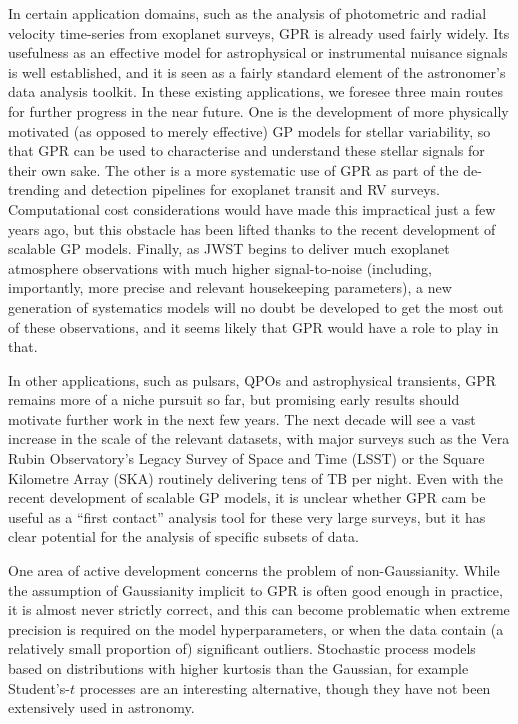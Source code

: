 \documentclass[letterpaper]{ar-1col}
\begin{document}
In certain application domains, such as the analysis of photometric and radial velocity time-series from exoplanet surveys, GPR is already used fairly widely. Its usefulness as an effective model for astrophysical or instrumental nuisance signals is well established, and it is seen as a fairly standard element of the astronomer's data analysis toolkit. In these existing applications, we foresee three main routes for further progress in the near future. One is the development of more physically motivated (as opposed to merely effective) GP models for stellar variability, so that GPR can be used to characterise and understand these stellar signals for their own sake. The other is a more systematic use of GPR as part of the de-trending and detection pipelines for exoplanet transit and RV surveys. Computational cost considerations would have made this impractical just a few years ago, but this obstacle has been lifted thanks to the recent development of scalable GP models. Finally, as JWST begins to deliver much exoplanet atmosphere observations with much higher signal-to-noise (including, importantly, more precise and relevant housekeeping parameters), a new generation of systematics models will no doubt be developed to get the most out of these observations, and it seems likely that GPR would have a role to play in that.

In other applications, such as pulsars, QPOs and astrophysical transients, GPR remains more of a niche pursuit so far, but promising early results should motivate further work in the next few years. The next decade will see a vast increase in the scale of the relevant datasets, with major surveys such as the Vera Rubin Observatory's Legacy Survey of Space and Time (LSST) or the Square Kilometre Array (SKA) routinely delivering tens of TB per night. Even with the recent development of scalable GP models, it is unclear whether GPR cam be useful as a ``first contact'' analysis tool for these very large surveys, but it has clear potential for the analysis of specific subsets of data.

One area of active development concerns the problem of non-Gaussianity. While the assumption of Gaussianity implicit to GPR is often good enough in practice, it is almost never strictly correct, and this can become problematic when extreme precision is required on the model hyperparameters, or when the data contain (a relatively small proportion of) significant outliers. Stochastic process models based on distributions with higher kurtosis than the Gaussian, for example Student's-$t$ processes are an interesting alternative, though they have not been extensively used in astronomy.
\end{document}
